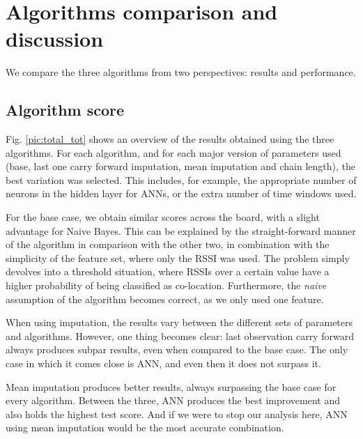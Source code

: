 \section {Algorithms comparison and discussion}

We compare the three algorithms from two perspectives: results and performance.

\subsection{Algorithm score}

Fig. \ref{pic:total_tot} shows an overview of the results obtained using the three algorithms. For each algorithm, and for each major version of parameters used (base, last one carry forward imputation, mean imputation and chain length), the best variation was selected. This includes, for example, the appropriate number of neurons in the hidden layer for ANNs, or the extra number of time windows used. 

For the base case, we obtain similar scores across the board, with a slight advantage for Naive Bayes. This can be explained by the straight-forward manner of the algorithm in comparison with the other two, in combination with the simplicity of the feature set, where only the RSSI was used. The problem simply devolves into a threshold situation, where RSSIs over a certain value have a higher probability of being classified as co-location. Furthermore, the \textit{naive} assumption of the algorithm becomes correct, as we only used one feature.

When using imputation, the results vary between the different sets of parameters and algorithms. However, one thing becomes clear: last observation carry forward always produces subpar results, even when compared to the base case. The only case in which it comes close is ANN, and even then it does not surpass it. 

Mean imputation produces better results, always surpassing the base case for every algorithm. Between the three, ANN produces the best improvement and also holds the highest test score. And if we were to stop our analysis here, ANN using mean imputation would be the most accurate combination.  

